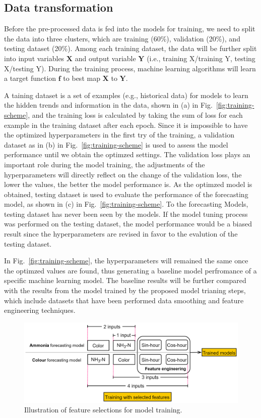 \subsection{Data transformation}
Before the pre-processed data is fed into the models for training, we need to split the data into three clusters, which are training (60\%), validation (20\%), and testing dataset (20\%). Among each training dataset, the data will be further split into input variables $\bm{X}$ and output variable $\bm{Y}$ (i.e., training X/training Y, testing X/testing Y). During the training process, machine learning algorithms will learn a target function $\bm{f}$ to best map $\bm{X}$ to $\bm{Y}$. 

A taining dataset is a set of examples (e.g., historical data) for models to learn the hidden trends and information in the data, shown in (a) in Fig.~\ref{fig:training-scheme}, and the training loss is calculated by taking the sum of loss for each example in the training dataset after each epoch. Since it is impossible to have the optimized hyperparameters in the first try of the training, a validation dataset as in (b) in Fig.~\ref{fig:training-scheme} is used to assess the model performance until we obtain the optimzed settings. The validation loss plays an important role during the model training, the adjustments of the hyperparameters will directly reflect on the change of the validation loss, the lower the values, the better the model performance is. As the optimzed model is obtained, testing dataset is used to evaluate the performance of the forecasting model, as shown in (c) in Fig.~\ref{fig:training-scheme}. To the forecasting Models, testing dataset has never been seen by the models. If the model tuning process was performed on the testing dataset, the model performance would be a biased result since the hyperparameters are revised in favor to the evalution of the testing dataset.

In Fig.~\ref{fig:training-scheme}, the hyperparameters will remained the same once the optimzed values are found, thus generating a baseline model perfromance of a specific machine learning model. The baseline results will be further compared with the results from the model trained by the proposed model trianing steps, which include datasets that have been performed data smoothing and feature engineering techniques.

\begin{figure}[h]
    \centering
    \includegraphics[width=0.8\columnwidth]{imgs/pre-processing/feature-selection.png}
    \caption{Illustration of feature selections for model training.}
    \label{fig:feature-selection}
 \end{figure}

